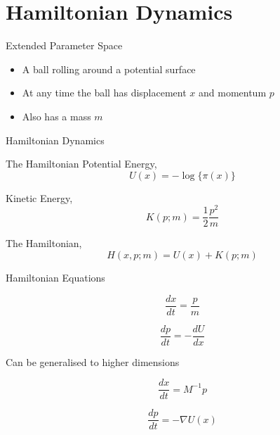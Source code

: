 \documentclass{beamer}
\begin{document}

\section{Hamiltonian Dynamics}


\begin{frame}{Extended Parameter Space}
\begin{itemize}
\item A ball rolling around a potential surface \vskip 5mm
\item At any time the ball has displacement $x$ and momentum $p$ \vskip 5mm
\item Also has a mass $m$ \vskip 5mm
\end{itemize}
\end{frame}

\begin{frame}{Hamiltonian Dynamics}

\begin{figure}
\centering
{}
\end{figure}
\end{frame}


\begin{frame}{The Hamiltonian}
Potential Energy,
\begin{equation*}
U(x) = - \log \{\pi(x)\}
\end{equation*}

Kinetic Energy,
\begin{equation*}
K(p; m) = \frac{1}{2} \frac{p^2}{m}
\end{equation*}

The Hamiltonian,
\begin{equation*}
H(x, p; m) = U(x) + K(p;m)
\end{equation*}
\end{frame}

\begin{frame}{Hamiltonian Equations}

\begin{equation*}
\frac{dx}{dt} = \frac{p}{m}
\end{equation*}

\begin{equation*}
\frac{dp}{dt} = - \frac{dU}{dx}
\end{equation*}

Can be generalised to higher dimensions

\begin{equation*}
\frac{dx}{dt} = M^{-1}p
\end{equation*}

\begin{equation*}
\frac{dp}{dt} = - \nabla U(x)
\end{equation*}

\end{frame}
\end{document}
